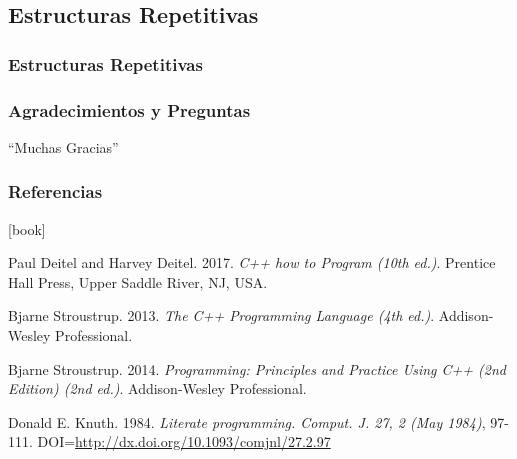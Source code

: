\documentclass[xcolor=table]{beamer}
\begin{document}
\subsection{Estructuras Repetitivas}
\begin{frame}
\frametitle{Estructuras Repetitivas}    
\end{frame}


\begin{frame}
\frametitle{Agradecimientos y Preguntas}
\centering
    \Huge{``Muchas Gracias''}
\end{frame}

\begin{frame}
\frametitle{Referencias}
\footnotesize{
[book]
\begin{thebibliography}{99} %

Paul Deitel and Harvey Deitel. 2017. \emph{C++ how to Program (10th ed.)}. Prentice Hall Press, Upper Saddle River, NJ, USA.

Bjarne Stroustrup. 2013. \emph{The C++ Programming Language (4th ed.)}. Addison-Wesley Professional.

Bjarne Stroustrup. 2014. \emph{Programming: Principles and Practice Using C++ (2nd Edition) (2nd ed.)}. Addison-Wesley Professional.


 Donald E. Knuth. 1984. \emph{Literate programming. Comput. J. 27, 2 (May 1984)}, 97-111. DOI=\url{http://dx.doi.org/10.1093/comjnl/27.2.97} 

\end{thebibliography}
}
\end{frame}

\end{document}

